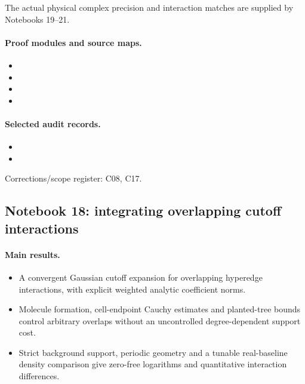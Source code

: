 The actual physical complex precision and interaction matches are supplied by Notebooks 19--21.

\paragraph{Proof modules and source maps.}
\begingroup\small
\begin{itemize}
\item {}
\item {}
\item {}
\item {}
\end{itemize}
\endgroup

\paragraph{Selected audit records.}
\begingroup\small
\begin{itemize}
\item {}
\item {}
\end{itemize}
\endgroup
Corrections/scope register: C08, C17.\par

\subsection{Notebook 18: integrating overlapping cutoff interactions}
\label{hnc-18}
\noindent{}\par

\paragraph{Main results.}
\begin{itemize}
\item A convergent Gaussian cutoff expansion for overlapping hyperedge interactions, with explicit weighted analytic coefficient norms.
\item Molecule formation, cell-endpoint Cauchy estimates and planted-tree bounds control arbitrary overlaps without an uncontrolled degree-dependent support cost.
\item Strict background support, periodic geometry and a tunable real-baseline density comparison give zero-free logarithms and quantitative interaction differences.
\end{itemize}

